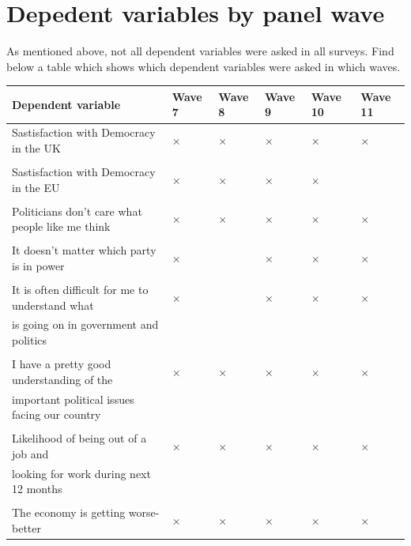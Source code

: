 \documentclass[12pt, letter]{article}
\begin{document}
\begin{center}
\begin{longtable}{lcccccc}
\toprule[1.5pt]



\end{longtable}
\end{center}

\section{Depedent variables by panel wave}
As mentioned above, not all dependent variables were asked in all surveys. Find below a table which shows which dependent variables were asked in which waves. 

\begin{center}
\scriptsize
\begin{longtable}{llllll}
\toprule[1.5pt]
Dependent variable & Wave 7 & Wave 8 & Wave 9 & Wave 10 & Wave 11 \\ 
\toprule[1pt]
Sastisfaction with Democracy in the UK & $\times$ & $\times$ & $\times$ & $\times$ & $\times$ \\ 
 \\[-4pt]
Sastisfaction with Democracy in the EU & $\times$ & $\times$ & $\times$ & $\times$ &  \\ 
 \\[-4pt]
Politicians don't care what people like me think & $\times$ & $\times$ & $\times$ & $\times$ & $\times$ \\ 
 \\[-4pt]
It doesn't matter which party is in power & $\times$ &  & $\times$ & $\times$ & $\times$ \\ 
 \\[-4pt]
It is often difficult for me to understand what  & $\times$ &  & $\times$ & $\times$ & $\times$ \\
is going on in government and politics &&&&& \\
 \\[-4pt]
I have a pretty good understanding of the & $\times$ & $\times$ & $\times$ & $\times$ & $\times$ \\ 
important political issues facing our country &&&&& \\ 
 \\[-4pt]
Likelihood of being out of a job and & $\times$ & $\times$ & $\times$ & $\times$ & $\times$ \\ 
looking for work during next 12 months &&&&& \\
 \\[-4pt]
The economy is getting worse-better & $\times$ & $\times$ & $\times$ & $\times$ & $\times$ \\ 

\end{longtable}
\end{center}
\end{document}
